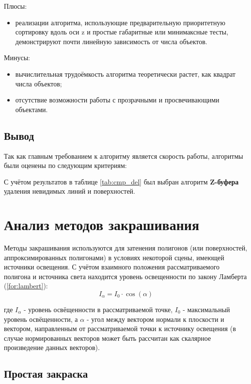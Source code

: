 Плюсы:
\begin{itemize}
    \item реализации алгоритма, использующие предварительную приоритетную
        сортировку вдоль оси z и простые габаритные или минимаксные тесты,
        демонстрируют почти линейную зависимость от числа
        объектов\cite{robert}.
\end{itemize}

Минусы:
\begin{itemize}
    \item вычислительная трудоёмкость алгоритма теоретически растет, как
        квадрат числа объектов\cite{robert};
    \item отсутствие возможности работы с прозрачными и просвечивающими
        объектами.
\end{itemize}

\subsection*{Вывод}

Так как главным требованием к алгоритму является скорость работы, алгоритмы
были оценены по следующим критериям:

С учётом результатов в таблице \ref{tab:cmp_del} был выбран алгоритм
\textbf{Z-буфера} удаления невидимых линий и поверхностей.


\section{Анализ методов закрашивания}

Методы закрашивания используются для затенения полигонов (или поверхностей,
аппроксимированных полигонами) в условиях некоторой сцены, имеющей источники
освещения. С учётом взаимного положения рассматриваемого полигона и источника
света находится уровень освещенности по закону Ламберта (\ref{for:lambert}):
\begin{equation}
    \label{for:lambert}
    I_{\alpha} = I_0 \cdot \cos{(\alpha)}
\end{equation}

где $I_{\alpha}$ - уровень освёщенности в рассматриваемой точке, $I_0$ -
максимальный уровень освёщенности, а $\alpha$ - угол между вектором нормали к
плоскости и вектором, направленным от рассматриваемой точки к источнику
освещения (в случае нормированных векторов может быть рассчитан как скалярное
произведение данных векторов).

\subsection{Простая закраска}


